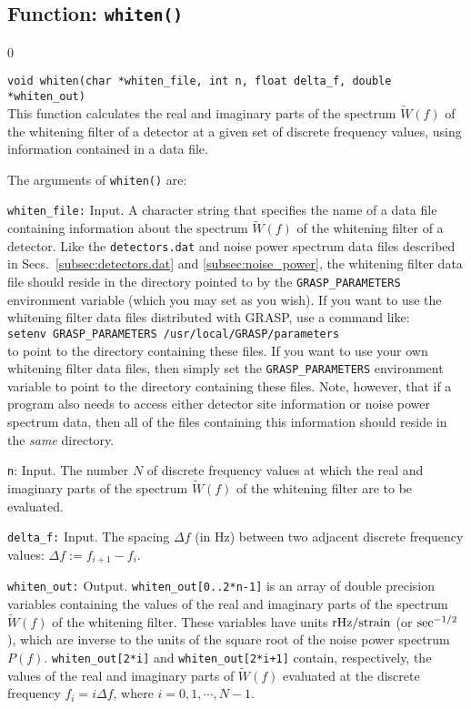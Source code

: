 \subsection{Function: {\tt whiten()}}
\label{subsec:whiten}
\setcounter{equation}0

{\tt void whiten(char *whiten\_file, int n, float delta\_f, 
double *whiten\_out)}\\
%
This function calculates the real and imaginary parts of the spectrum
$\tilde W(f)$ of the whitening filter of a detector at a given set of 
discrete frequency values, using information contained in a data file.

The arguments of {\tt whiten()} are:
\begin{description}
%
\item{\tt whiten\_file:} Input. 
A character string that specifies
the name of a data file containing information about the 
spectrum $\tilde W(f)$ of the whitening filter of a detector.
Like the {\tt detectors.dat} and noise power spectrum data files 
described in 
Secs.~\ref{subsec:detectors.dat} and \ref{subsec:noise_power}, 
the whitening filter data file should
reside in the directory pointed to by the {\tt GRASP\_PARAMETERS} 
environment variable (which you may set as you wish).
If you want to use the whitening filter data files distributed with
GRASP, use a command like:\\
{\tt setenv GRASP\_PARAMETERS /usr/local/GRASP/parameters}\\
to point to the directory containing these files.  
If you want to use your own whitening filter data files, then simply
set the {\tt GRASP\_PARAMETERS} environment variable to point to the 
directory containing these files.
Note, however, that if a program also needs to access either detector 
site information or noise power spectrum data, then all of the files 
containing this information should reside in the {\it same} directory.
%
\item{\tt n}: Input.
The number $N$ of discrete frequency values at which the real and 
imaginary parts of the spectrum $\tilde W(f)$ of the whitening filter
are to be evaluated.
%
\item{\tt delta\_f:} Input.
The spacing $\Delta f$ (in Hz) between two adjacent discrete frequency
values: $\Delta f:=f_{i+1}-f_i$.  
%
\item{\tt whiten\_out:} Output.
{\tt whiten\_out[0..2*n-1]} is an array of double precision variables 
containing the values of the real and imaginary parts of the spectrum 
$\tilde W(f)$ of the whitening filter.
These variables have units ${\rm rHz}/{\rm strain}$ 
(or ${\rm sec}^{-1/2}$), which are inverse to the units of the square 
root of the noise power spectrum $P(f)$.
{\tt whiten\_out[2*i]} and {\tt whiten\_out[2*i+1]} contain, respectively, 
the values of the real and imaginary parts of $\tilde W(f)$
evaluated at the discrete frequency $f_i=i\Delta f$, where 
$i=0,1,\cdots,N-1$.
\end{description}

